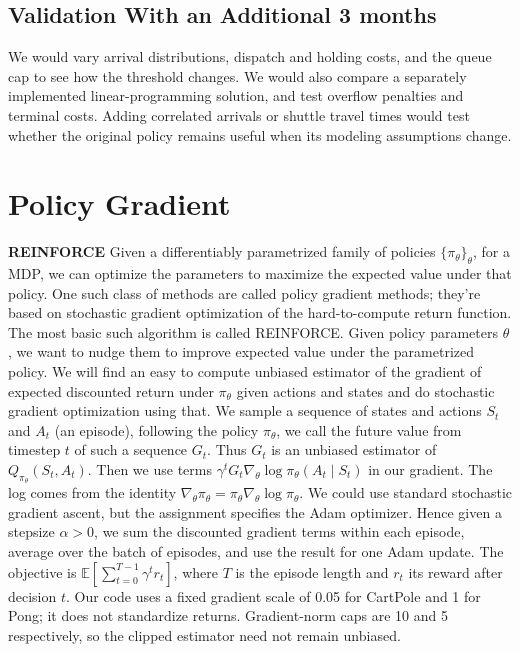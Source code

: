 \documentclass{article}
\begin{document}
\subsection{Validation With an Additional 3 months}
We would vary arrival distributions, dispatch and holding costs, and the queue cap to see how the threshold changes. We would also compare a separately implemented linear-programming solution, and test overflow penalties and terminal costs. Adding correlated arrivals or shuttle travel times would test whether the original policy remains useful when its modeling assumptions change.

\section{Policy Gradient}
\textbf{REINFORCE}
Given a differentiably parametrized family of policies $\{ \pi_\theta\}_\theta$, for a MDP, we can optimize the parameters to maximize the expected value under that policy. One such class of methods are called policy gradient methods; they're based on stochastic gradient optimization of the hard-to-compute return function. The most basic such algorithm is called REINFORCE. Given policy parameters $\theta$, we want to nudge them to improve expected value under the parametrized policy. We will find an easy to compute unbiased estimator of the gradient of expected discounted return under $\pi_\theta$ given actions and states and do stochastic gradient optimization using that. We sample a sequence of states and actions $S_t$ and $A_t$ (an episode), following the policy $\pi_\theta$, we call the future value from timestep $t$ of such a sequence $G_t$. Thus $G_t$ is an unbiased estimator of $Q_{\pi_\theta}(S_t, A_t)$. Then we use terms $\gamma^tG_t\nabla_\theta\log\pi_\theta(A_t\mid S_t)$ in our gradient. The log comes from the identity $\nabla_\theta\pi_\theta=\pi_\theta\nabla_\theta\log\pi_\theta$. We could use standard stochastic gradient ascent, but the assignment specifies the Adam optimizer. Hence given a stepsize $\alpha>0$, we sum the discounted gradient terms within each episode, average over the batch of episodes, and use the result for one Adam update. The objective is $\mathbb E[\sum_{t=0}^{T-1}\gamma^t r_t]$, where $T$ is the episode length and $r_t$ its reward after decision $t$. Our code uses a fixed gradient scale of 0.05 for CartPole and 1 for Pong; it does not standardize returns. Gradient-norm caps are 10 and 5 respectively, so the clipped estimator need not remain unbiased.
\end{document}
